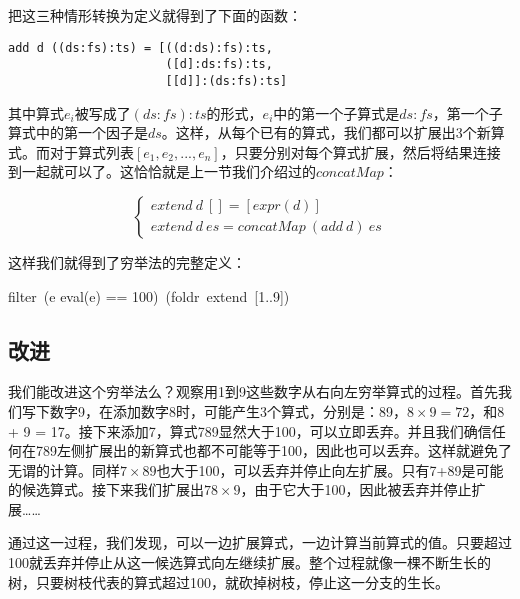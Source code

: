 \documentclass[b5paper]{ctexart}
\begin{document}
把这三种情形转换为定义就得到了下面的函数：

\lstset{frame = none}
\begin{lstlisting}
add d ((ds:fs):ts) = [((d:ds):fs):ts,
                      ([d]:ds:fs):ts,
                      [[d]]:(ds:fs):ts]
\end{lstlisting}

其中算式$e_i$被写成了$(ds:fs):ts$的形式，$e_i$中的第一个子算式是$ds:fs$，第一个子算式中的第一个因子是$ds$。这样，从每个已有的算式，我们都可以扩展出3个新算式。而对于算式列表$[e_1, e_2, ..., e_n]$，只要分别对每个算式扩展，然后将结果连接到一起就可以了。这恰恰就是上一节我们介绍过的$concatMap$：

\[
\begin{cases}
extend\ d\ [] = [expr(d)] \\
extend\ d\ es = concatMap\ (add\ d)\ es
\end{cases}
\]

这样我们就得到了穷举法的完整定义：

\be
filter\ (e \mapsto eval(e) == 100)\ (foldr\ extend\ [1..9])
\label{eq:puzzle100-basic}
\ee

\subsection{改进}

我们能改进这个穷举法么？观察用1到9这些数字从右向左穷举算式的过程。首先我们写下数字9，在添加数字8时，可能产生3个算式，分别是：89，$8 \times 9 = 72$，和8 + 9 = 17。接下来添加7，算式789显然大于100，可以立即丢弃。并且我们确信任何在789左侧扩展出的新算式也都不可能等于100，因此也可以丢弃。这样就避免了无谓的计算。同样$7 \times 89$也大于100，可以丢弃并停止向左扩展。只有7+89是可能的候选算式。接下来我们扩展出$78 \times 9$，由于它大于100，因此被丢弃并停止扩展……

通过这一过程，我们发现，可以一边扩展算式，一边计算当前算式的值。只要超过100就丢弃并停止从这一候选算式向左继续扩展。整个过程就像一棵不断生长的树，只要树枝代表的算式超过100，就砍掉树枝，停止这一分支的生长。
\end{document}
